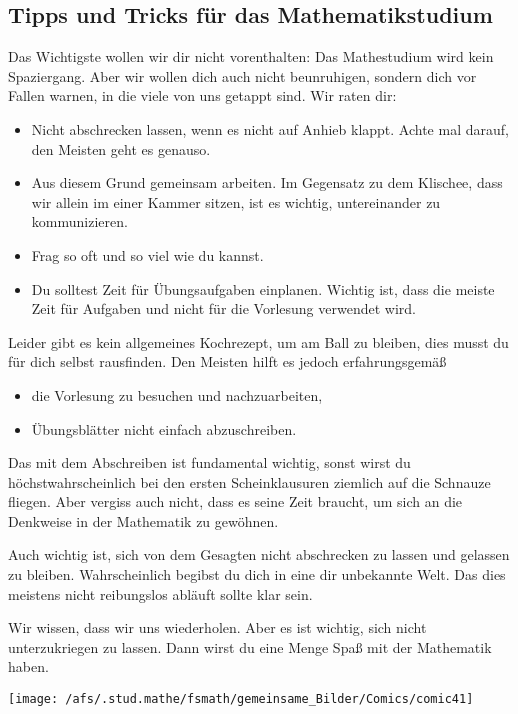 \subsection{Tipps und Tricks für das Mathematikstudium}
Das Wichtigste wollen wir dir nicht vorenthalten:
Das Mathestudium wird kein Spaziergang.
Aber wir wollen dich auch nicht beunruhigen,
sondern dich vor Fallen warnen, in die viele von uns getappt sind.
Wir raten dir:
\begin{itemize}
\item
Nicht abschrecken lassen, wenn es nicht auf Anhieb klappt.
Achte mal darauf, den Meisten geht es genauso.

\item
Aus diesem Grund gemeinsam arbeiten.
Im Gegensatz zu dem Klischee, dass wir allein im einer Kammer sitzen, ist es wichtig, untereinander zu kommunizieren.

\item
Frag so oft und so viel wie du kannst.

\item
Du solltest Zeit für Übungsaufgaben einplanen.
Wichtig ist, dass die meiste Zeit für Aufgaben und nicht für die
Vorlesung verwendet wird.
\end{itemize}
Leider gibt es kein allgemeines Kochrezept, um am Ball zu bleiben,
dies musst du für dich selbst rausfinden.
Den Meisten hilft es jedoch erfahrungsgemäß
\begin{itemize}
\item
die Vorlesung zu besuchen und nachzuarbeiten,
\item
Übungsblätter nicht einfach abzuschreiben.
\end{itemize}
Das mit dem Abschreiben ist fundamental wichtig,
sonst wirst du höchstwahrscheinlich bei den ersten Scheinklausuren
ziemlich auf die Schnauze fliegen.
Aber vergiss auch nicht,
dass es seine Zeit braucht,
um sich an die Denkweise in der Mathematik zu gewöhnen.

Auch wichtig ist,
sich von dem Gesagten nicht abschrecken zu lassen und gelassen zu bleiben.
Wahrscheinlich begibst du dich in eine dir unbekannte Welt.
Das dies meistens nicht reibungslos abläuft sollte klar sein.

Wir wissen, dass wir uns wiederholen.
Aber es ist wichtig, sich nicht unterzukriegen zu lassen.
Dann wirst du eine Menge Spaß mit der Mathematik haben.
  
\newpage
\vspace*{4cm}
{

}
{
\begin{center}
  \texttt{[image: /afs/.stud.mathe/fsmath/gemeinsame\_Bilder/Comics/comic41]}
\end{center}
}
\newpage

